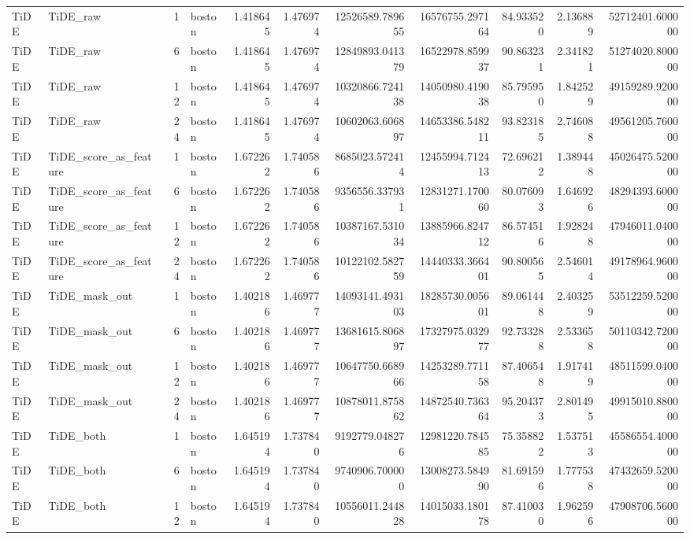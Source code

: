 \begin{longtable}{llrlrrrrrrr}
TiDE & TiDE\_raw & 1 & boston & 1.418645 & 1.476974 & 12526589.789655 & 16576755.297164 & 84.933520 & 2.136889 & 52712401.600000 \\
TiDE & TiDE\_raw & 6 & boston & 1.418645 & 1.476974 & 12849893.041379 & 16522978.859937 & 90.863231 & 2.341821 & 51274020.800000 \\
TiDE & TiDE\_raw & 12 & boston & 1.418645 & 1.476974 & 10320866.724138 & 14050980.419038 & 85.795950 & 1.842529 & 49159289.920000 \\
TiDE & TiDE\_raw & 24 & boston & 1.418645 & 1.476974 & 10602063.606897 & 14653386.548211 & 93.823185 & 2.746088 & 49561205.760000 \\
TiDE & TiDE\_score\_as\_feature & 1 & boston & 1.672262 & 1.740586 & 8685023.572414 & 12455994.712413 & 72.696212 & 1.389448 & 45026475.520000 \\
TiDE & TiDE\_score\_as\_feature & 6 & boston & 1.672262 & 1.740586 & 9356556.337931 & 12831271.170060 & 80.076093 & 1.646926 & 48294393.600000 \\
TiDE & TiDE\_score\_as\_feature & 12 & boston & 1.672262 & 1.740586 & 10387167.531034 & 13885966.824712 & 86.574516 & 1.928248 & 47946011.040000 \\
TiDE & TiDE\_score\_as\_feature & 24 & boston & 1.672262 & 1.740586 & 10122102.582759 & 14440333.366401 & 90.800565 & 2.546014 & 49178964.960000 \\
TiDE & TiDE\_mask\_out & 1 & boston & 1.402186 & 1.469777 & 14093141.493103 & 18285730.005601 & 89.061448 & 2.403259 & 53512259.520000 \\
TiDE & TiDE\_mask\_out & 6 & boston & 1.402186 & 1.469777 & 13681615.806897 & 17327975.032977 & 92.733288 & 2.533658 & 50110342.720000 \\
TiDE & TiDE\_mask\_out & 12 & boston & 1.402186 & 1.469777 & 10647750.668966 & 14253289.771158 & 87.406548 & 1.917419 & 48511599.040000 \\
TiDE & TiDE\_mask\_out & 24 & boston & 1.402186 & 1.469777 & 10878011.875862 & 14872540.736364 & 95.204373 & 2.801495 & 49915010.880000 \\
TiDE & TiDE\_both & 1 & boston & 1.645194 & 1.737840 & 9192779.048276 & 12981220.784585 & 75.358822 & 1.537513 & 45586554.400000 \\
TiDE & TiDE\_both & 6 & boston & 1.645194 & 1.737840 & 9740906.700000 & 13008273.584990 & 81.691596 & 1.777538 & 47432659.520000 \\
TiDE & TiDE\_both & 12 & boston & 1.645194 & 1.737840 & 10556011.244828 & 14015033.180178 & 87.410030 & 1.962596 & 47908706.560000 \\

\end{longtable}
